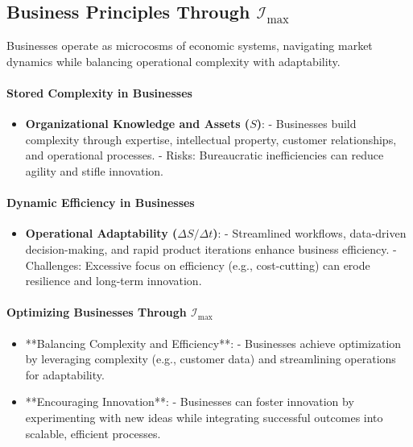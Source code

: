 \documentclass[12pt]{article}
\begin{document}
\subsection{Business Principles Through \(\mathcal{I}_{\text{max}}\)}
Businesses operate as microcosms of economic systems, navigating market dynamics while balancing operational complexity with adaptability.

\paragraph{Stored Complexity in Businesses}
\begin{itemize}
    \item \textbf{Organizational Knowledge and Assets (\( S \))}:
        - Businesses build complexity through expertise, intellectual property, customer relationships, and operational processes.
        - Risks: Bureaucratic inefficiencies can reduce agility and stifle innovation.
\end{itemize}

\paragraph{Dynamic Efficiency in Businesses}
\begin{itemize}
    \item \textbf{Operational Adaptability (\( \Delta S / \Delta t \))}:
        - Streamlined workflows, data-driven decision-making, and rapid product iterations enhance business efficiency.
        - Challenges: Excessive focus on efficiency (e.g., cost-cutting) can erode resilience and long-term innovation.
\end{itemize}

\paragraph{Optimizing Businesses Through \(\mathcal{I}_{\text{max}}\)}
\begin{itemize}
    \item **Balancing Complexity and Efficiency**:
        - Businesses achieve optimization by leveraging complexity (e.g., customer data) and streamlining operations for adaptability.
    \item **Encouraging Innovation**:
        - Businesses can foster innovation by experimenting with new ideas while integrating successful outcomes into scalable, efficient processes.
\end{itemize}
\end{document}
